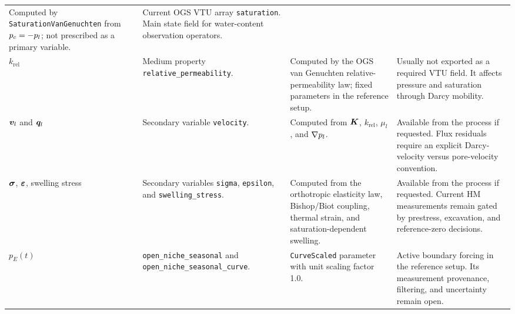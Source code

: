 \begin{longtable}{@{}L{0.15\textwidth} L{0.27\textwidth} L{0.25\textwidth} L{0.23\textwidth}@{}}
Computed by \texttt{SaturationVanGenuchten} from \(p_c=-p_l\); not prescribed as a
primary variable. &
Current OGS VTU array \texttt{saturation}.  Main state field for water-content
observation operators.\\
\(k_{\mathrm{rel}}\) &
Medium property \texttt{relative\_permeability}. &
Computed by the OGS van Genuchten relative-permeability law; fixed parameters in
the reference setup. &
Usually not exported as a required VTU field.  It affects pressure and saturation
through Darcy mobility.\\
\(\bm{v}_{l}\) and \(\bm{q}_{l}\) &
Secondary variable \texttt{velocity}. &
Computed from \(\bm{K}\), \(k_{\mathrm{rel}}\), \(\mu_l\), and \(\nabla p_l\). &
Available from the process if requested.  Flux residuals require an explicit
Darcy-velocity versus pore-velocity convention.\\
\(\bm{\sigma}\), \(\bm{\varepsilon}\), swelling stress &
Secondary variables \texttt{sigma}, \texttt{epsilon}, and \texttt{swelling\_stress}. &
Computed from the orthotropic elasticity law, Bishop/Biot coupling, thermal strain,
and saturation-dependent swelling. &
Available from the process if requested.  Current HM measurements remain gated by
prestress, excavation, and reference-zero decisions.\\
\(p_E(t)\) &
\texttt{open\_niche\_seasonal} and \texttt{open\_niche\_seasonal\_curve}. &
\texttt{CurveScaled} parameter with unit scaling factor 1.0. &
Active boundary forcing in the reference setup.  Its measurement provenance,
filtering, and uncertainty remain open.\\
\end{longtable}
\endgroup
